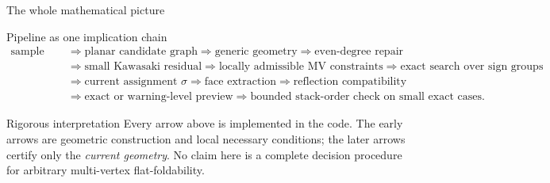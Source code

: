 \documentclass[aspectratio=169,10pt]{beamer}
\begin{document}
\begin{frame}{The whole mathematical picture}
\begin{block}{Pipeline as one implication chain}
\scriptsize
\[
\begin{aligned}
\text{sample points}
&\Longrightarrow
\text{planar candidate graph}
\Longrightarrow
\text{generic geometry}
\Longrightarrow
\text{even-degree repair}
\\
&\Longrightarrow
\text{small Kawasaki residual}
\Longrightarrow
\text{locally admissible MV constraints}
\Longrightarrow
\text{exact search over sign groups}
\\
&\Longrightarrow
\text{current assignment }\sigma
\Longrightarrow
\text{face extraction}
\Longrightarrow
\text{reflection compatibility}
\\
&\Longrightarrow
\text{exact or warning-level preview}
\Longrightarrow
\text{bounded stack-order check on small exact cases.}
\end{aligned}
\]
\end{block}

\begin{alertblock}{Rigorous interpretation}
\footnotesize Every arrow above is implemented in the code. The early arrows
are geometric construction and local necessary conditions; the later arrows
certify only the \emph{current geometry}. No claim here is a complete decision
procedure for arbitrary multi-vertex flat-foldability.
\end{alertblock}
\end{frame}
\end{document}
